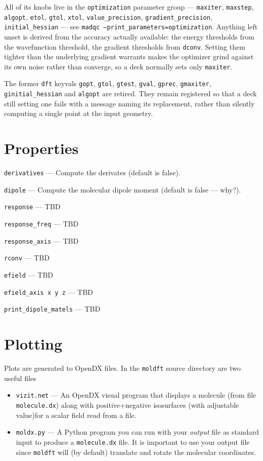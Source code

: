 \documentclass[letterpaper]{book}
\begin{document}
All of its knobs live in the {\tt optimization} parameter group --- {\tt maxiter},
{\tt maxstep}, {\tt algopt}, {\tt etol}, {\tt gtol}, {\tt xtol},
{\tt value\_precision}, {\tt gradient\_precision}, {\tt initial\_hessian} --- see
{\tt madqc --print\_parameters=optimization}.  Anything left unset is derived from
the accuracy actually available: the energy thresholds from the wavefunction
threshold, the gradient thresholds from {\tt dconv}.  Setting them tighter than
the underlying gradient warrants makes the optimizer grind against its own noise
rather than converge, so a deck normally sets only {\tt maxiter}.

The former {\tt dft} keyvals {\tt gopt}, {\tt gtol}, {\tt gtest}, {\tt gval},
{\tt gprec}, {\tt gmaxiter}, {\tt ginitial\_hessian} and {\tt algopt} are retired.
They remain registered so that a deck still setting one fails with a message
naming its replacement, rather than silently computing a single point at the
input geometry.

\section{Properties}

{\tt derivatives} --- Compute the derivates (default is false).

{\tt dipole} --- Compute the molecular dipole moment (default is false --- why?).

{\tt response} --- TBD

{\tt response\_freq} ---  TBD

{\tt response\_axis} --- TBD

{\tt rconv} --- TBD

{\tt efield} --- TBD

{\tt efield\_axis x y z} --- TBD

{\tt print\_dipole\_matels} --- TBD

\section{Plotting}

Plots are generated to OpenDX files.  In the {\tt moldft} source directory are two useful files

\begin{itemize}
\item {\tt vizit.net} --- An OpenDX visual program that displays a
  molecule (from file {\tt molecule.dx}) along with positive+negative
  isosurfaces (with adjustable value)for a scalar field read from a
  file.

\item {\tt moldx.py} --- A Python program you can run with your {\em
  output} file as standard input to produce a {\tt molecule.dx} file.
  It is important to use your output file since {\tt moldft} will (by
  default) translate and rotate the molecular coordinates.
  
\end{itemize}
\end{document}
